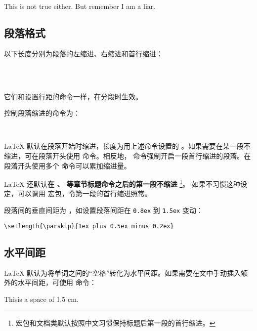 \begin{example}
{\Large This is not true either.
But remember I am a liar.}\par
\end{example}

\subsection{段落格式}\label{subsec:par-shape}

以下长度分别为段落的左缩进、右缩进和首行缩进：
\begin{command}
  \\
 \\
\end{command}

它们和设置行距的命令一样，在分段时生效。

控制段落缩进的命令为：

\begin{command}
 \\
\end{command}

\LaTeX{} 默认在段落开始时缩进，长度为用上述命令设置的 。如果需要在某一段不缩进，可在段落开头使用
 命令。相反地， 命令强制开启一段首行缩进的段落。在段落开头使用多个  命令可以累加缩进量。

\LaTeX{} 还默认\textbf{在 、 等章节标题命令之后的第一段不缩进}%
\footnote{ 宏包和文档类默认按照中文习惯保持标题后第一段的首行缩进。}。
如果不习惯这种设定，可以调用  宏包，令第一段的首行缩进照常。

段落间的垂直间距为 ，如设置段落间距在 \texttt{0.8ex} 到 \texttt{1.5ex} 变动：
\begin{verbatim}
\setlength{\parskip}{1ex plus 0.5ex minus 0.2ex}
\end{verbatim}

\subsection{水平间距}\label{subsec:hspace}

\LaTeX{} 默认为将单词之间的“空格”转化为水平间距。如果需要在文中手动插入额外的水平间距，可使用  命令：
\begin{example}
This\hspace{1.5cm}is a space
of 1.5 cm.
\end{example}

